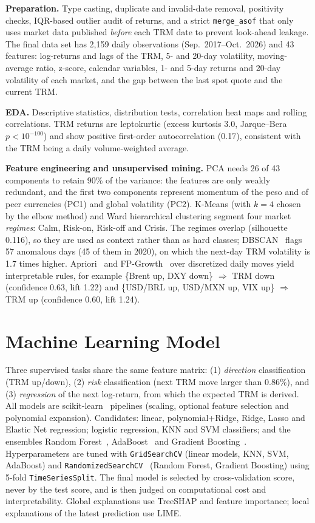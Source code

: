 \documentclass[conference]{IEEEtran}
\begin{document}
\textbf{Preparation.} Type casting, duplicate and invalid-date removal, positivity checks, IQR-based outlier audit of returns, and a strict \texttt{merge\_asof} that only uses market data published \emph{before} each TRM date to prevent look-ahead leakage. The final data set has 2{,}159 daily observations (Sep.~2017--Oct.~2026) and 43 features: log-returns and lags of the TRM, 5- and 20-day volatility, moving-average ratio, z-score, calendar variables, 1- and 5-day returns and 20-day volatility of each market, and the gap between the last spot quote and the current TRM.

\textbf{EDA.} Descriptive statistics, distribution tests, correlation heat maps and rolling correlations. TRM returns are leptokurtic (excess kurtosis 3.0, Jarque--Bera $p<10^{-100}$) and show positive first-order autocorrelation (0.17), consistent with the TRM being a daily volume-weighted average.

\textbf{Feature engineering and unsupervised mining.} PCA needs 26 of 43 components to retain 90\% of the variance: the features are only weakly redundant, and the first two components represent momentum of the peso and of peer currencies (PC1) and global volatility (PC2). K-Means (with $k=4$ chosen by the elbow method) and Ward hierarchical clustering segment four market \emph{regimes}: Calm, Risk-on, Risk-off and Crisis. The regimes overlap (silhouette 0.116), so they are used as context rather than as hard classes; DBSCAN~\cite{ester1996} flags 57 anomalous days (45 of them in 2020), on which the next-day TRM volatility is 1.7 times higher. Apriori~\cite{agrawal1994} and FP-Growth~\cite{han2000} over discretized daily moves yield interpretable rules, for example \{Brent up, DXY down\} $\Rightarrow$ TRM down (confidence 0.63, lift 1.22) and \{USD/BRL up, USD/MXN up, VIX up\} $\Rightarrow$ TRM up (confidence 0.60, lift 1.24).

\section{Machine Learning Model}
Three supervised tasks share the same feature matrix: (1) \emph{direction} classification (TRM up/down), (2) \emph{risk} classification (next TRM move larger than 0.86\%), and (3) \emph{regression} of the next log-return, from which the expected TRM is derived. All models are scikit-learn~\cite{pedregosa2011} pipelines (scaling, optional feature selection and polynomial expansion). Candidates: linear, polynomial+Ridge, Ridge, Lasso and Elastic Net regression; logistic regression, KNN and SVM classifiers; and the ensembles Random Forest~\cite{breiman2001}, AdaBoost~\cite{freund1997} and Gradient Boosting~\cite{friedman2001}. Hyperparameters are tuned with \texttt{GridSearchCV} (linear models, KNN, SVM, AdaBoost) and \texttt{RandomizedSearchCV}~\cite{bergstra2012} (Random Forest, Gradient Boosting) using 5-fold \texttt{TimeSeriesSplit}. The final model is selected by cross-validation score, never by the test score, and is then judged on computational cost and interpretability. Global explanations use TreeSHAP and feature importance; local explanations of the latest prediction use LIME.
\end{document}
